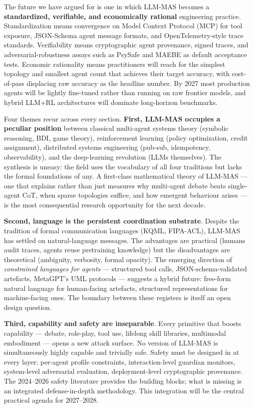 \documentclass{article}
\begin{document}
The future we have argued for is one in which LLM-MAS becomes a \textbf{standardized, verifiable, and economically rational} engineering practice. Standardization means convergence on Model Context Protocol (MCP) for tool exposure, JSON-Schema agent message formats, and OpenTelemetry-style trace standards. Verifiability means cryptographic agent provenance, signed traces, and adversarial-robustness assays such as PsySafe and MAEBE as default acceptance tests. Economic rationality means practitioners will reach for the simplest topology and smallest agent count that achieves their target accuracy, with cost-of-pass displacing raw accuracy as the headline number. By 2027 most production agents will be lightly fine-tuned rather than running on raw frontier models, and hybrid LLM+RL architectures will dominate long-horizon benchmarks.

Four themes recur across every section. \textbf{First, LLM-MAS occupies a peculiar position} between classical multi-agent systems theory (symbolic reasoning, BDI, game theory), reinforcement learning (policy optimization, credit assignment), distributed systems engineering (pub-sub, idempotency, observability), and the deep-learning revolution (LLMs themselves). The synthesis is uneasy: the field uses the vocabulary of all four traditions but lacks the formal foundations of any. A first-class mathematical theory of LLM-MAS --- one that explains rather than just measures why multi-agent debate beats single-agent CoT, when sparse topologies suffice, and how emergent behaviour arises --- is the most consequential research opportunity for the next decade.

\textbf{Second, language is the persistent coordination substrate}. Despite the tradition of formal communication languages (KQML, FIPA-ACL), LLM-MAS has settled on natural-language messages. The advantages are practical (humans audit traces, agents reuse pretraining knowledge) but the disadvantages are theoretical (ambiguity, verbosity, formal opacity). The emerging direction of \emph{constrained languages for agents} --- structured tool calls, JSON-schema-validated artefacts, MetaGPT's UML protocols --- suggests a hybrid future: free-form natural language for human-facing artefacts, structured representations for machine-facing ones. The boundary between these registers is itself an open design question.

\textbf{Third, capability and safety are inseparable}. Every primitive that boosts capability --- debate, role-play, tool use, lifelong skill libraries, multimodal embodiment --- opens a new attack surface. No version of LLM-MAS is simultaneously highly capable and trivially safe. Safety must be designed in at every layer: per-agent profile constraints, interaction-level guardian monitors, system-level adversarial evaluation, deployment-level cryptographic provenance. The 2024--2026 safety literature provides the building blocks; what is missing is an integrated defense-in-depth methodology. This integration will be the central practical agenda for 2027--2028.
\end{document}
